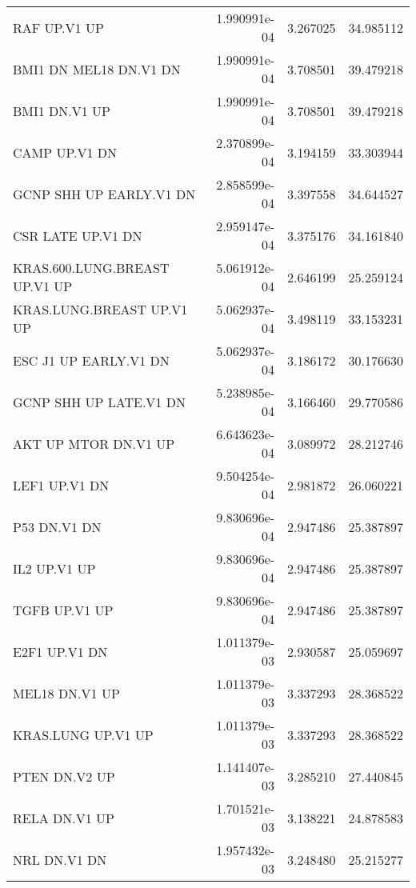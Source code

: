 \begin{tabular}{lrrr}
                      RAF UP.V1 UP &      1.990991e-04 &  3.267025 &       34.985112 \\
            BMI1 DN MEL18 DN.V1 DN &      1.990991e-04 &  3.708501 &       39.479218 \\
                     BMI1 DN.V1 UP &      1.990991e-04 &  3.708501 &       39.479218 \\
                     CAMP UP.V1 DN &      2.370899e-04 &  3.194159 &       33.303944 \\
           GCNP SHH UP EARLY.V1 DN &      2.858599e-04 &  3.397558 &       34.644527 \\
                 CSR LATE UP.V1 DN &      2.959147e-04 &  3.375176 &       34.161840 \\
     KRAS.600.LUNG.BREAST UP.V1 UP &      5.061912e-04 &  2.646199 &       25.259124 \\
         KRAS.LUNG.BREAST UP.V1 UP &      5.062937e-04 &  3.498119 &       33.153231 \\
             ESC J1 UP EARLY.V1 DN &      5.062937e-04 &  3.186172 &       30.176630 \\
            GCNP SHH UP LATE.V1 DN &      5.238985e-04 &  3.166460 &       29.770586 \\
              AKT UP MTOR DN.V1 UP &      6.643623e-04 &  3.089972 &       28.212746 \\
                     LEF1 UP.V1 DN &      9.504254e-04 &  2.981872 &       26.060221 \\
                      P53 DN.V1 DN &      9.830696e-04 &  2.947486 &       25.387897 \\
                      IL2 UP.V1 UP &      9.830696e-04 &  2.947486 &       25.387897 \\
                     TGFB UP.V1 UP &      9.830696e-04 &  2.947486 &       25.387897 \\
                     E2F1 UP.V1 DN &      1.011379e-03 &  2.930587 &       25.059697 \\
                    MEL18 DN.V1 UP &      1.011379e-03 &  3.337293 &       28.368522 \\
                KRAS.LUNG UP.V1 UP &      1.011379e-03 &  3.337293 &       28.368522 \\
                     PTEN DN.V2 UP &      1.141407e-03 &  3.285210 &       27.440845 \\
                     RELA DN.V1 UP &      1.701521e-03 &  3.138221 &       24.878583 \\
                      NRL DN.V1 DN &      1.957432e-03 &  3.248480 &       25.215277 \\

\end{tabular}
